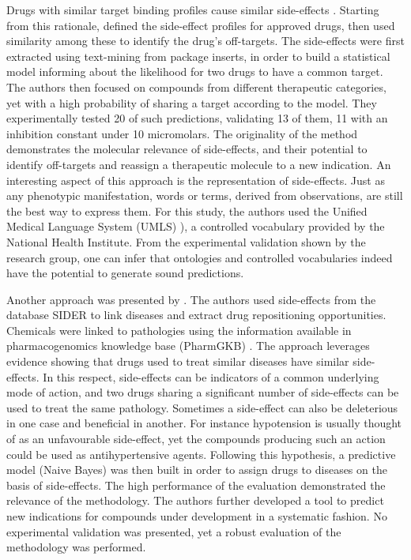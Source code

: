 Drugs with similar target binding profiles cause similar side-effects \citep{fliri2005analysis} \citep{fliri2007analysis}. Starting from this rationale, \cite{campillos2008drug} defined the side-effect profiles for approved drugs, then used similarity among these to identify the drug's off-targets. The side-effects were first extracted using text-mining from package inserts, in order to build a statistical model informing about the likelihood for two drugs to have a common target. The authors then focused on compounds from different therapeutic categories, yet with a high probability of sharing a target according to the model. They experimentally tested 20 of such predictions, validating 13 of them, 11 with an inhibition constant under 10 micromolars. The originality of the method demonstrates the molecular relevance of side-effects, and their potential to identify off-targets and reassign a therapeutic molecule to a new indication. An interesting aspect of this approach is the representation of side-effects. Just as any phenotypic manifestation, words or terms, derived from observations, are still the best way to express them. For this study, the authors used the Unified Medical Language System (UMLS) \citep{bodenreider2004unified}), a controlled vocabulary provided by the National Health Institute. From the experimental validation shown by the research group, one can infer that ontologies and controlled vocabularies indeed have the potential to generate sound predictions.

Another approach was presented by \cite{yang2011systematic}. The authors used side-effects from the database SIDER \citep{kuhn2010side} to link diseases and extract drug repositioning opportunities. Chemicals were linked to pathologies using the information available in pharmacogenomics knowledge base (PharmGKB) \citep{whirl2012pharmacogenomics}. The approach leverages evidence showing that drugs used to treat similar diseases have similar side-effects. In this respect, side-effects can be indicators of a common underlying mode of action, and two drugs sharing a significant number of side-effects can be used to treat the same pathology. Sometimes a side-effect can also be deleterious in one case and beneficial in another. For instance hypotension is usually thought of as an unfavourable side-effect, yet the compounds producing such an action could be used as antihypertensive agents. Following this hypothesis, a predictive model (Naive Bayes) was then built in order to assign drugs to diseases on the basis of side-effects. The high performance of the evaluation demonstrated the relevance of the methodology. The authors further developed a tool to predict new indications for compounds under development in a systematic fashion. No experimental validation was presented, yet a robust evaluation of the methodology was performed.

